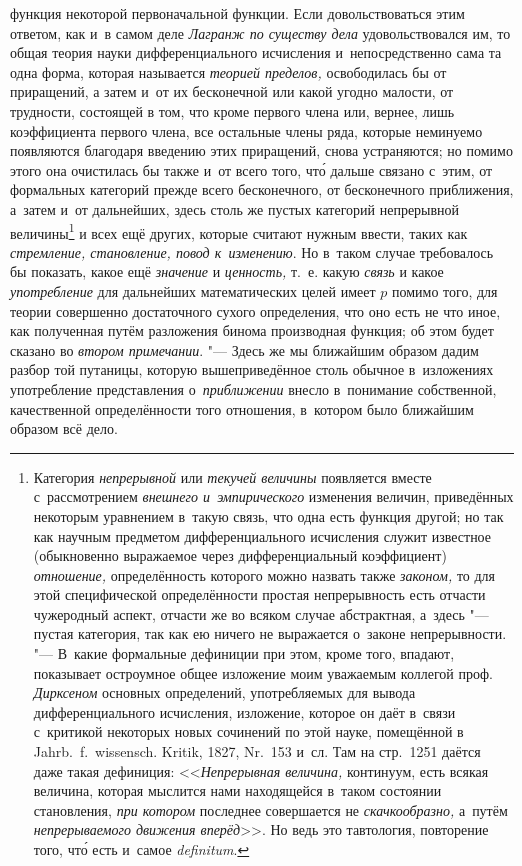 функция некоторой первоначальной функции. Если довольствоваться этим ответом,
как и~в самом деле {\em Лагранж по существу дела} удовольствовался им, то общая
теория науки дифференциального исчисления и~непосредственно сама та одна форма,
которая называется {\em теорией пределов,} освободилась бы от приращений, а
затем и~от их бесконечной или какой угодно малости, от трудности, состоящей в
том, что кроме первого члена или, вернее, лишь коэффициента первого члена, все
остальные члены ряда, которые неминуемо появляются благодаря введению этих
приращений, снова устраняются; но помимо этого она очистилась бы также и~от
всего того, чт\'{о} дальше связано с~этим, от формальных категорий прежде всего
бесконечного, от бесконечного приближения, а~затем и~от дальнейших, здесь столь же
пустых категорий непрерывной величины\footnote{Категория {\em непрерывной} или
{\em текучей величины} появляется вместе с~рассмотрением
{\em внешнего и~эмпирического} изменения величин, приведённых некоторым
уравнением в~такую связь, что одна есть функция другой; но так как научным
предметом дифференциального исчисления служит известное (обыкновенно выражаемое
через дифференциальный коэффициент) {\em отношение,} определённость которого
можно назвать также {\em законом,} то для этой специфической
определённости простая непрерывность есть отчасти чужеродный аспект, отчасти же
во всяком случае абстрактная, а~здесь "--- пустая категория, так как ею ничего
не выражается о~законе непрерывности. "--- В~какие формальные дефиниции при
этом, кроме того, впадают, показывает остроумное общее изложение моим уважаемым
коллегой проф. {\em Дирксеном} основных определений, употребляемых для вывода
дифференциального исчисления, изложение, которое он даёт в~связи с~критикой
некоторых новых сочинений по этой науке, помещённой в Jahrb.~f.~wis\-sen\-sch.
Kri\-tik, 1827, Nr.~153 и~сл. Там на стр.~1251 даётся даже такая дефиниция:
<<{\em Непрерывная величина,} континуум, есть всякая величина, которая мыслится нами
находящейся в~таком состоянии становления, {\em при котором} последнее совершается не
{\em скачкообразно,} а~путём {\em непрерываемого движения вперёд}>>. Но ведь
это тавтология, повторение того, чт\'{о} есть и~самое {\em de\-fi\-ni\-tum}.} и
всех ещё других, которые считают нужным ввести, таких как
{\em стремление, становление, повод к~изменению}. Но в~таком случае требовалось
бы показать, какое ещё {\em значение} и {\em ценность,} т.~е. какую {\em связь}
и какое {\em употребление} для дальнейших математических целей имеет $p$ помимо
того, для теории совершенно достаточного сухого определения, что оно есть
не что иное, как полученная путём разложения бинома производная функция; об этом
будет сказано во {\em втором примечании}. "--- Здесь же мы ближайшим образом
дадим разбор той путаницы, которую вышеприведённое столь обычное в~изложениях
употребление представления о~{\em приближении} внесло в~понимание собственной,
качественной определённости того отношения, в~котором было ближайшим образом
всё дело.

